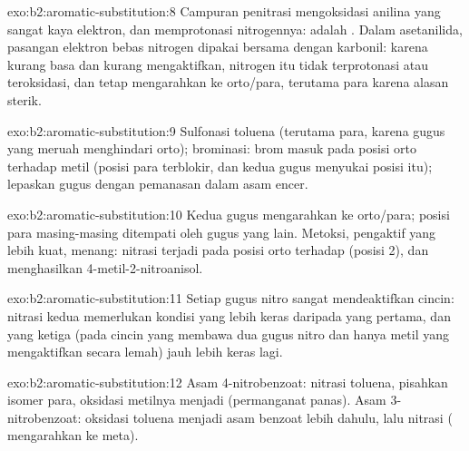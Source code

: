 \begin{solution}{exo:b2:aromatic-substitution:8}
Campuran penitrasi mengoksidasi anilina yang sangat kaya elektron, dan
memprotonasi nitrogennya:  adalah  .
Dalam asetanilida, pasangan elektron bebas nitrogen dipakai bersama dengan
karbonil: karena kurang basa dan kurang mengaktifkan, nitrogen itu tidak
terprotonasi atau teroksidasi, dan tetap mengarahkan ke orto/para, terutama
para karena alasan sterik.
\end{solution}

\begin{solution}{exo:b2:aromatic-substitution:9}
Sulfonasi toluena (terutama para, karena gugus yang meruah menghindari
orto); brominasi: brom masuk pada posisi orto terhadap metil (posisi para
terblokir, dan kedua gugus menyukai posisi itu); lepaskan gugus 
dengan pemanasan dalam asam encer.
\end{solution}

\begin{solution}{exo:b2:aromatic-substitution:10}
Kedua gugus mengarahkan ke orto/para; posisi para masing-masing ditempati
oleh gugus yang lain. Metoksi, pengaktif yang lebih kuat, menang: nitrasi
terjadi pada posisi orto terhadap  (posisi 2), dan menghasilkan
4-metil-2-nitroanisol.
\end{solution}

\begin{solution}{exo:b2:aromatic-substitution:11}
Setiap gugus nitro sangat mendeaktifkan cincin: nitrasi kedua memerlukan
kondisi yang lebih keras daripada yang pertama, dan yang ketiga (pada
cincin yang membawa dua gugus nitro dan hanya metil yang mengaktifkan
secara lemah) jauh lebih keras lagi.
\end{solution}

\begin{solution}{exo:b2:aromatic-substitution:12}
Asam 4-nitrobenzoat: nitrasi toluena, pisahkan isomer para, oksidasi
metilnya menjadi  (permanganat panas). Asam 3-nitrobenzoat:
oksidasi toluena menjadi asam benzoat lebih dahulu, lalu nitrasi
( mengarahkan ke meta).
\end{solution}

